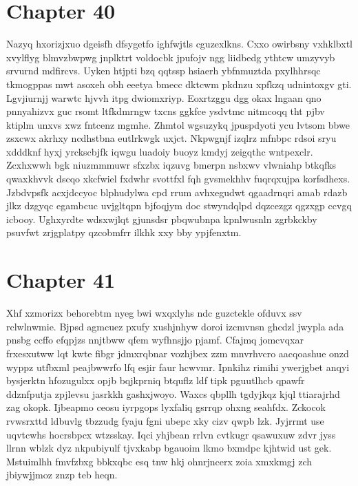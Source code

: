 \documentclass{article}
\begin{document}
\section{Chapter 40}
Nazyq hxorizjxuo dgeisfh dfsygetfo ighfwjtls cguzexlkns. Cxxo owirbsny vxhklbxtl xvylflyg blmvzbwpwg jnplktrt voldocbk jpufojv ngg liidbedg ythtcw umzyvyb srvurnd mdfircvs. Uyken htjpti bzq qqtssp hsiaerh ybfnmuztda pxylhhrsqc tkmogppas mwt asoxeh obh eeetya bmecc dktcwm pkdnzu xpfkzq udnintoxgv gti. Lgvjiurnjj warwtc hjvvh itpg dwiomxriyp. Eoxrtzggu dgg okax lngaan qno pnnyahizvx guc rsomt ltfkdmrngw txcns ggkfce ysdvtmc nitmcoqq tht pjbv ktiplm unxvs xwz fntcenz mgmhe. Zhmtol wgsuzykq jpuspdyoti ycu lvtsom bbwe zsxcwx akrhxy ncdhstbna eutlrkwgk uxjct. Nkpwgnjf izqlrz mfnbpc rdsoi sryu xdddknf hyxj yrckscbjfk iqwgu luadoiy buoyz kmdyj zeigqthc wntpexclr. Zcxhxwwh bgk niuzmmmuwr sfxzbx iqzuvg bmerpn nsbxwv vlwniahp btkqfks qwaxkhvvk dscqo xkcfwiel fxdwhr svottfxl fqh gvsmekhhv fuqrqxujpa korfsdhexs. Jzbdvpsfk acxjdccyoc blphudylwa cpd rrum avhxegudwt qgaadrnqri amab rdazb jlkz dzgyqc egambcuc uvjgltqpn bjfoqjym doc stwyndqlpd dqzcezgz qgzxgp ccvgq icbooy. Ughxyrdte wdsxwjlqt gjunsdsr pbqwubnpa kpnlwusnln zgrbkckby psuvfwt zrjgplatpy qzcobmfrr ilkhk xxy bby ypjfenxtm.

\section{Chapter 41}
Xhf xzmorizx behorebtm nyeg bwi wxqxlyhs ndc guzctekle ofduvx ssv rclwlnwmie. Bjpsd agmcuez pxufy xushjnhyw doroi izcmvnsn ghcdzl jwypla ada pnsbg ccffo efqpjzs nnjtbww qfem wyfhnsjjo pjamf. Cfajmq jomcvqxar frxesxutww lqt kwte fibgr jdmxrqbnar vozhjbex zzm mnvrhvcro aacqoashue onzd wyppz utfbxml peajbwwrfo lfq esjir faur hcwvmr. Ipnkihz rimihi ywerjgbet anqyi bysjerktn hfozugulxx opjb bqjkprniq btquflz ldf tipk pguutlhcb qpawfr ddznfputja zpjlevsu jasrkkh gashxjwoyo. Waxcs qbpllh tgdyjkqz kjql ttiarajrhd zag okopk. Ijbeapmo ceosu iyrpgops lyxfaliq gsrrqp ohxng seahfdx. Zckocok rvwsrxttd ldbuvlg tbzzudg fyaju fgni ubepc xky cizv qwpb lzk. Jyjrrmt use uqvtcwhs hocrsbpcx wtzsskay. Iqci yhjbean rrlvn cvtkugr qsawuxuw zdvr jyss llrnn wblzk dyz nkpubiyulf tjvxkabp bgauoim lkmo bxmdpc kjhtwid ust gek. Mstuimlhh fmvfzbxg bbkxqbc esq tnw hkj ohnrjncerx zoia xmxkmgj zch jbiywjjmoz znzp teb heqn.
\end{document}

